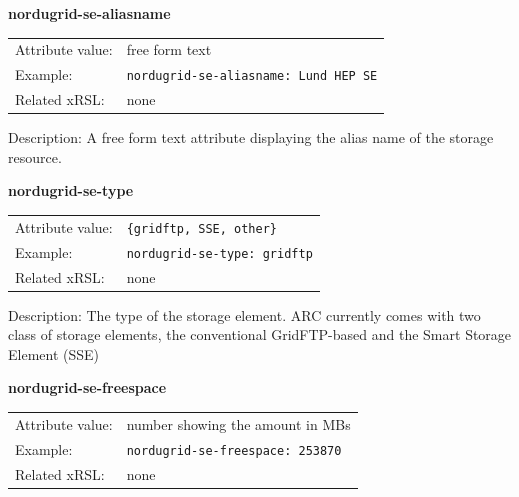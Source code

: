 \documentclass{article}
\begin{document}

  \hspace*{0.5cm}
  \begin{shaded}
    \textbf{nordugrid-se-aliasname}
  \end{shaded}
  \begin{tabular}{lp{10cm}}  
    Attribute value:& free form text\\
    Example:& \verb#nordugrid-se-aliasname: Lund HEP SE#\\
    Related xRSL:& none\\
  \end{tabular}

Description:
A free form text attribute displaying the alias name of the storage resource.


  \hspace*{0.5cm}
  \begin{shaded}
    \textbf{nordugrid-se-type}
  \end{shaded}
  \begin{tabular}{lp{10cm}}  
    Attribute value:& \verb#{gridftp, SSE, other}#\\    
    Example:& \verb#nordugrid-se-type: gridftp#\\
    Related xRSL:& none\\
  \end{tabular}

Description: The type of the storage element. ARC currently comes with two
class of storage elements, the conventional GridFTP-based and the 
Smart Storage Element (SSE)\cite{smartse}



  \hspace*{0.5cm}
  \begin{shaded}
    \textbf{nordugrid-se-freespace}
  \end{shaded}
  \begin{tabular}{lp{10cm}}  
    Attribute value:&  number showing the amount in MBs\\
    Example:& \verb#nordugrid-se-freespace: 253870#\\
    Related xRSL:& none\\
  \end{tabular}
\end{document}
